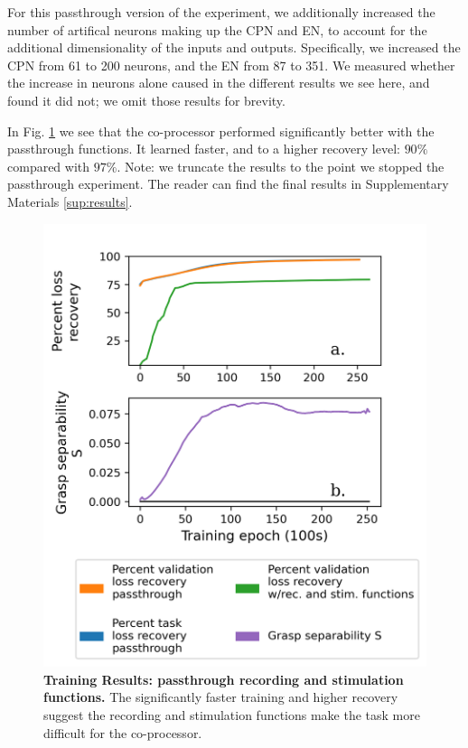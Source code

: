 \documentclass[12pt]{iopart}
\begin{document}
For this passthrough version of the experiment, we additionally increased the number of artifical neurons
making up the CPN and EN, to account for the additional dimensionality of the inputs and outputs. Specifically,
we increased the CPN from 61 to 200 neurons, and the EN from 87 to 351. We measured whether the increase in
neurons alone caused in the different results we see here, and found it did not; we omit those results for
brevity.

In Fig. \ref{fig:results_passthrough} we see that the co-processor performed significantly better with
the passthrough functions. It learned faster, and to a higher recovery level: $90\%$ compared with $97\%$.
Note: we truncate the results to the point we stopped the passthrough experiment. The reader can find the
final results in Supplementary Materials \ref{sup:results}.

\begin{figure}[h!]
\centering
\includegraphics[scale=0.7]{training_results_passthrough.png}
\caption{\textbf{Training Results: passthrough recording and stimulation functions.} The significantly faster
         training and higher recovery suggest the recording and stimulation functions make the task
         more difficult for the co-processor.}
\label{fig:results_passthrough}
\end{figure}
\end{document}

